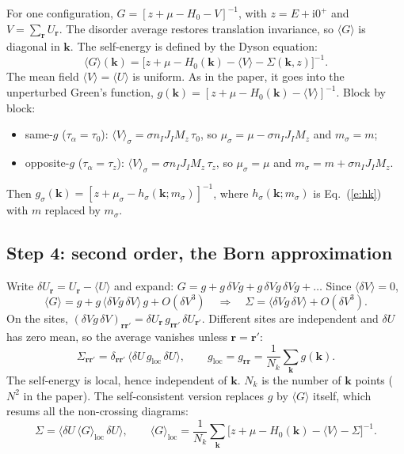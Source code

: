 \documentclass[11pt,a4paper]{article}
\newcommand{\I}{\mathrm{i}}
\begin{document}
For one configuration, $G=[z+\mu-H_0-V]^{-1}$, with $z=E+\I0^+$ and $V=\sum_{\bm r}U_{\bm r}$. The disorder
average restores translation invariance, so $\langle G\rangle$ is diagonal in $\bm k$. The self-energy is
defined by the Dyson equation:
\begin{equation}
\langle G\rangle(\bm k) = \big[z+\mu-H_0(\bm k)-\langle V\rangle-\Sigma(\bm k,z)\big]^{-1}.
\label{e:dyson}
\end{equation}
The mean field $\langle V\rangle=\langle U\rangle$ is uniform. As in the paper, it goes into the unperturbed
Green's function, $g(\bm k)=[z+\mu-H_0(\bm k)-\langle V\rangle]^{-1}$. Block by block:
\begin{itemize}
\item same-$g$ ($\tau_\alpha=\tau_0$): $\langle V\rangle_\sigma=\sigma n_IJ_IM_z\,\tau_0$, so $\mu_\sigma=\mu-\sigma n_IJ_IM_z$ and
  $m_\sigma=m$;
\item opposite-$g$ ($\tau_\alpha=\tau_z$): $\langle V\rangle_\sigma=\sigma n_IJ_IM_z\,\tau_z$, so $\mu_\sigma=\mu$ and
  $m_\sigma=m+\sigma n_IJ_IM_z$.
\end{itemize}
Then $g_\sigma(\bm k)=[z+\mu_\sigma-h_\sigma(\bm k;m_\sigma)]^{-1}$, where $h_\sigma(\bm k;m_\sigma)$ is
Eq.~(\ref{e:hk}) with $m$ replaced by $m_\sigma$.

\subsection{Step 4: second order, the Born approximation}\label{st:born}

Write $\delta U_{\bm r}=U_{\bm r}-\langle U\rangle$ and expand: $G=g+g\,\delta V g+g\,\delta Vg\,\delta Vg+\dots$ Since
$\langle\delta V\rangle=0$,
\begin{equation}
\langle G\rangle = g + g\,\langle\delta V g\,\delta V\rangle\,g + O(\delta V^3)
\quad\Longrightarrow\quad \Sigma=\langle\delta V g\,\delta V\rangle + O(\delta V^3).
\end{equation}
On the sites, $(\delta Vg\,\delta V)_{\bm r\bm r'}=\delta U_{\bm r}\,g_{\bm r\bm r'}\,\delta U_{\bm r'}$. Different sites are independent
and $\delta U$ has zero mean, so the average vanishes unless $\bm r=\bm r'$:
\begin{equation}
\Sigma_{\bm r\bm r'}=\delta_{\bm r\bm r'}\,\langle\delta U\,g_{\mathrm{loc}}\,\delta U\rangle,\qquad
g_{\mathrm{loc}}=g_{\bm r\bm r}=\frac1{N_k}\sum_{\bm k}g(\bm k).
\end{equation}
The self-energy is local, hence independent of $\bm k$. $N_k$ is the number of $\bm k$ points
($N^2$ in the paper). The self-consistent version replaces $g$ by $\langle G\rangle$ itself, which resums
all the non-crossing diagrams:
\begin{equation}
\Sigma=\langle\delta U\,\langle G\rangle_{\mathrm{loc}}\,\delta U\rangle,\qquad
\langle G\rangle_{\mathrm{loc}}=\frac1{N_k}\sum_{\bm k}\big[z+\mu-H_0(\bm k)-\langle V\rangle-\Sigma\big]^{-1}.
\label{e:scba}
\end{equation}
\end{document}
